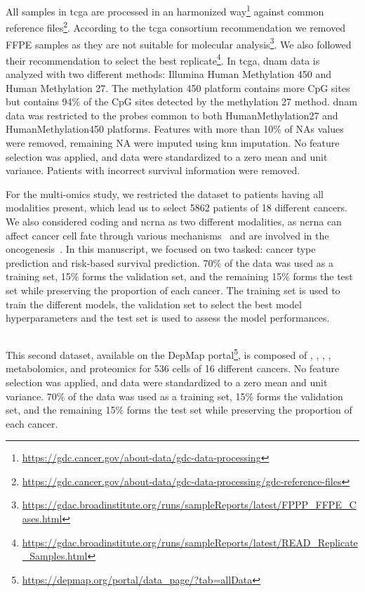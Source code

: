 \documentclass[../main.tex]{subfiles}
\begin{document}
     All samples in \gls{tcga} are processed in an harmonized way\footnote{\url{https://gdc.cancer.gov/about-data/gdc-data-processing}} against common reference files\footnote{\url{https://gdc.cancer.gov/about-data/gdc-data-processing/gdc-reference-files}}.
     According to the \gls{tcga} consortium recommendation we removed FFPE samples as they are not suitable for molecular analysis\footnote{\href{https://web.archive.org/web/20150919082952/https://gdac.broadinstitute.org/runs/sampleReports/latest/FPPP_FFPE_Cases.html}{https://gdac.broadinstitute.org/runs/sampleReports/latest/FPPP\_FFPE\_Cases.html}}.
     We also followed their recommendation to select the best replicate\footnote{\href{https://web.archive.org/web/20150919044554/http://gdac.broadinstitute.org/runs/sampleReports/latest/READ_Replicate_Samples.html}{https://gdac.broadinstitute.org/runs/sampleReports/latest/READ\_Replicate\_Samples.html}}.
     In \gls{tcga}, \gls{dnam} data is analyzed with two different methods: Illumina Human Methylation 450 and Human Methylation 27.
     The methylation 450 platform contains more CpG sites but contains 94\% of the CpG sites detected by the methylation 27 method.
     \Gls{dnam} data was restricted to the probes common to both HumanMethylation27 and HumanMethylation450 platforms.
     Features with more than 10\% of NAs values were removed, remaining NA were imputed using \gls{knn} imputation.
     No feature selection was applied, and data were standardized to a zero mean and unit variance.
     Patients with incorrect survival information were removed.

     For the multi-omics study, we restricted the dataset to patients having all modalities present, which lead us to select 5862 patients of 18 different cancers.
     We also considered coding and \gls{ncrna} as two different modalities, as \gls{ncrna} can affect cancer cell fate through various mechanisms~\cite{Grillone2020} and are involved in the oncogenesis~\cite{Toden2021}.
     In this manuscript, we focused on two tasked: cancer type prediction and risk-based survival prediction.
     70\% of the data was used as a training set, 15\% forms the validation set, and the remaining 15\% forms the test set while preserving the proportion of each cancer.
     The training set is used to train the different models, the validation set to select the best model hyperparameters and the test set is used to assess the model performances.

 \subsection{}
     This second dataset, available on the DepMap portal\footnote{\url{https://depmap.org/portal/data_page/?tab=allData}}, is composed of , , , , metabolomics, and proteomics for 536 cells of 16 different cancers.
     No feature selection was applied, and data were standardized to a zero mean and unit variance.
     70\% of the data was used as a training set, 15\% forms the validation set, and the remaining 15\% forms the test set while preserving the proportion of each cancer.
\end{document}
